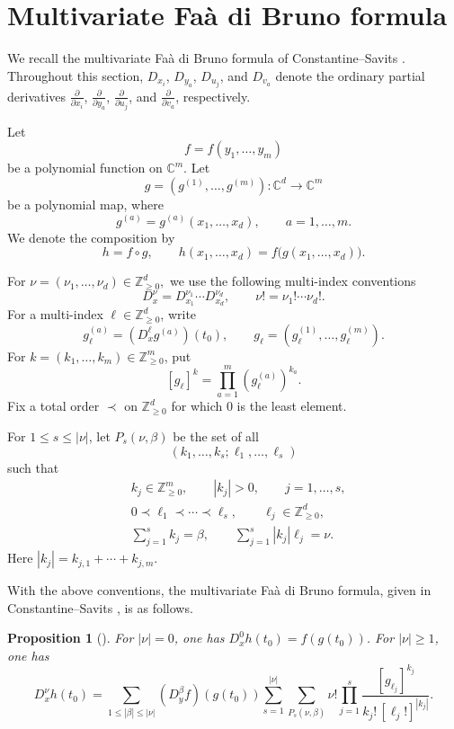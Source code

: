 \documentclass[11pt,reqno]{amsart}
\newtheorem{proposition}[theorem]{Proposition}
\theoremstyle{definition}
\newcommand{\bbC}{\mathbb{C}}
\newcommand{\bbZ}{\mathbb{Z}}
\newcommand{\cc}{\circ}
\begin{document}
\appendix




\section{Multivariate Fa\`a di Bruno formula}\label{app: fdb}

We recall the multivariate Fa\`a di Bruno formula of Constantine--Savits \cite{ConSav1996Mul}.
Throughout this section,
\(D_{x_i}\), \(D_{y_a}\), \(D_{u_j}\), and \(D_{v_a}\)
denote the ordinary partial derivatives
\(\frac{\partial}{\partial x_i}\),
\(\frac{\partial}{\partial y_a}\),
\(\frac{\partial}{\partial u_j}\), and
\(\frac{\partial}{\partial v_a}\), respectively.

Let
\[
f=f(y_1,\ldots,y_m)
\]
be a polynomial function on \(\bbC^m\). Let
\[
g=(g^{(1)},\ldots,g^{(m)}):\bbC^d\longrightarrow\bbC^m
\]
be a polynomial map, where
\[
g^{(a)}=g^{(a)}(x_1,\ldots,x_d),
\qquad a=1,\ldots,m.
\]
We denote the composition by
\[
h=f\cc g,
\qquad
h(x_1,\ldots,x_d)
=
f\bigl(g(x_1,\ldots,x_d)\bigr).
\]



For
\(\nu=(\nu_1,\ldots,\nu_d)\in\bbZ_{\geq 0}^d,\)
{we use the  following multi-index conventions}
\[
	D_x^\nu
	=
	D_{x_1}^{\nu_1}\cdots D_{x_d}^{\nu_d},
	\qquad
	\nu!=\nu_1!\cdots \nu_d!.
\]
For a multi-index \(\ell\in\bbZ_{\geq 0}^d\), write
\[
	g_\ell^{(a)}=(D_x^\ell g^{(a)})(t_0),
	\qquad
	g_\ell=(g_\ell^{(1)},\ldots,g_\ell^{(m)}).
\]
For \(k=(k_1,\ldots,k_m)\in\bbZ_{\geq 0}^m\), put
\[
	[g_\ell]^k=\prod_{a=1}^m (g_\ell^{(a)})^{k_a}.
\]
Fix a total order \(\prec\) on \(\bbZ_{\geq0}^d\) for which \(0\) is the
least element.

For \(1\leq s\leq |\nu|\), let \(P_s(\nu,\beta)\) be the set of all
\[
	(k_1,\ldots,k_s;\ell_1,\ldots,\ell_s)
\]
such that
\begin{align*}
&k_j\in\bbZ_{\geq 0}^m,
\qquad |k_j|>0,
\qquad j=1,\ldots,s,\\
&0\prec \ell_1\prec\cdots\prec\ell_s,
\qquad \ell_j\in\bbZ_{\geq 0}^d,\\
&\sum_{j=1}^s k_j=\beta,\qquad
\sum_{j=1}^s |k_j|\ell_j=\nu.
\end{align*}
Here \(|k_j|=k_{j,1}+\cdots+k_{j,m}\). 



With the above conventions,
the multivariate Fa\`a di Bruno formula,
given in
Constantine--Savits \cite{ConSav1996Mul},
is as follows.

\begin{proposition}[{\cite[Theorem 2.1]{ConSav1996Mul}}]
For \( |\nu|=0\), one has \(D_x^0h(t_0)=f(g(t_0))\).
For \( |\nu|\geq1\), one has
	\begin{equation}\label{for: CS}
	D_x^\nu h(t_0)
	=
	\sum_{1\leq |\beta|\leq |\nu|}
	(D_y^\beta f)(g(t_0))
	\sum_{s=1}^{|\nu|}
	\sum_{P_s(\nu,\beta)}
	\nu!
	\prod_{j=1}^s
	\frac{[g_{\ell_j}]^{k_j}}{k_j!\,[\ell_j!]^{|k_j|}}.
	\end{equation}
\end{proposition}
\end{document}

